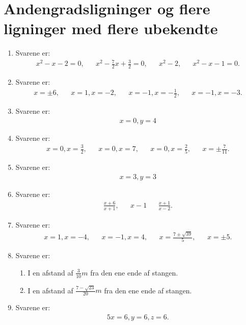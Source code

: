 \newpage
\section{Andengradsligninger og flere ligninger med flere ubekendte}
 \begin{enumerate}
\item Svarene er:
\begin{align*}
x^2-x-2=0,&& x^2-\frac{7}{2}x+\frac{3}{2}=0,&& x^2-2 ,&& x^2-x-1=0.
\end{align*}

\item Svarene er:
\begin{align*}
x=\pm 6,&&x=1,x=-2,&& x=-1,x=-\frac{1}{2},&& x=-1,x=-3.
\end{align*}

\item Svarene er:
\begin{align*}
x=0,y=4
\end{align*}
\item Svarene er:
\begin{align*}
x=0,x=\frac{3}{2},&& x=0, x=7,&& x=0,x=\frac{2}{5},&& x=\pm \frac{7}{11}.
\end{align*}

\item Svarene er:
\begin{align*}
x=3,y=3
\end{align*}

\item Svarene er:
\begin{align*}
\frac{x+6}{x+1},&& x-1&&\frac{x+1}{x-2}.
\end{align*}


\item Svarene er:
\begin{align*}
x=1,x=-4,&&x=-1,x=4,&&  x=\frac{7\pm \sqrt{39}}{5},&& x=\pm 5.
\end{align*}



\item Svarene er:
\begin{enumerate}
\item I en afstand af $\frac{3}{10}m$ fra den ene ende af stangen.
\item I en afstand af $\frac{7-\sqrt{23}}{20}m$ fra den ene ende af stangen.
\end{enumerate}

\item Svarene er:
\begin{alignat*}{5}
x=6,y=6,z=6.
\end{alignat*}



\end{enumerate}
